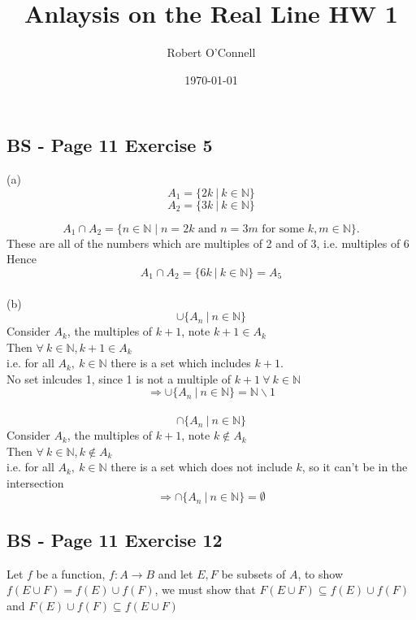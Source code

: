 \documentclass{article}
\title{\textbf{Anlaysis on the Real Line HW 1}}
\author{Robert O'Connell}
\date{\today}
\begin{document}
\maketitle
\vspace{5mm}

\subsection*{BS - Page 11 Exercise 5}
(a)
\\
\[
A_1 = \{2k \ | \ k \in \mathbb{N}\}
\]
\[
A_2 = \{3k \ | \ k \in \mathbb{N}\}
\]

\[
A_1 \cap A_2
= \{ n \in \mathbb{N} \mid n = 2k \text{ and } n = 3m \text{ for some } k,m \in \mathbb{N} \}.
\]
These are all of the numbers which are multiples of 2 and of 3, i.e. multiples of 6 \\
Hence
\[
A_1 \cap A_2 = \{6k \ | \ k \in \mathbb{N}\} = A_5
\]
\\

(b)
\\
\[
\cup \{A_n \ | \ n \in \mathbb{N}\} 
\]
Consider \(A_k\), the multiples of \(k+1\), note \(k+1 \in A_k\) \\
Then \(\forall \ k \in \mathbb{N}, k + 1 \in A_k\) \\
i.e. for all \(A_k, \ k \in \mathbb{N}\) there is a set which includes \(k+1\). \\
No set inlcudes 1, since 1 is not a multiple
of \(k+1 \ \forall \ k \in \mathbb{N}\)
\[\Rightarrow \cup \{A_n \ | \ n \in \mathbb{N}\} = \mathbb{N} \backslash {1}\]
\\

\[
\cap \{A_n \ | \ n \in \mathbb{N}\}
\]
Consider \(A_k\), the multiples of \(k+1\), note \(k \notin A_k\) \\
Then \(\forall \ k \in \mathbb{N}, k \notin A_k\) \\
i.e. for all \(A_k, \ k \in \mathbb{N}\) there is a set which does not include \(k\), so it can't be in the intersection
\[\Rightarrow \cap \{A_n \ | \ n \in \mathbb{N}\} = \emptyset\]



\subsection*{BS - Page 11 Exercise 12}
Let \(f\) be a function, \(f: A \rightarrow B\) and let \(E,F\) be subsets of \(A\), 
to show \(f(E \cup F) = f(E) \cup f(F)\), we must show that \(F(E \cup F) \subseteq f(E) \cup f(F) \) and 
\(F(E) \cup f(F) \subseteq f(E \cup F) \)
\\
\end{document}
